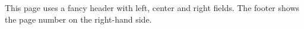 \documentclass{article}
\begin{document}
This page uses a fancy header with left, center and right fields.
The footer shows the page number on the right-hand side.
\end{document}
